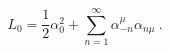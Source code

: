 \begin{equation}
L_{0} = \frac{1}{2} \alpha_{0}^{2} + \sum_{n=1}^{\infty} \alpha_{-n}^{\mu} \alpha_{n \mu}~. 
\end{equation}


